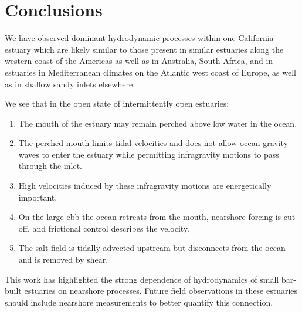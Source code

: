 

\section{Conclusions}

We have observed dominant hydrodynamic processes within one California
estuary which are likely similar to those present in similar estuaries
along the western coast of the Americas as well as in Australia, South
Africa, and in estuaries in Mediterranean climates on the Atlantic
west coast of Europe, as well as in shallow sandy inlets elsewhere.

We see that in the open state of intermittently open estuaries:
\begin{enumerate}
\item The mouth of the estuary may remain perched above low water in the
ocean.
\item The perched mouth limits tidal velocities and does not allow ocean
gravity waves to enter the estuary while permitting infragravity motions
to pass through the inlet.
\item High velocities induced by these infragravity motions are energetically
important.
\item On the large ebb the ocean retreats from the mouth, nearshore forcing
is cut off, and frictional control describes the velocity.
\item The salt field is tidally advected upstream but disconnects from the
ocean and is removed by shear.
\end{enumerate}
This work has highlighted the strong dependence of hydrodynamics of
small bar-built estuaries on nearshore processes. Future field observations
in these estuaries should include nearshore measurements to better
quantify this connection. 







